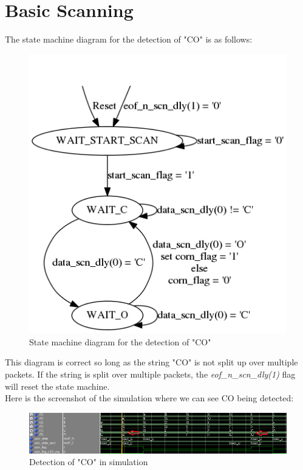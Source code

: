 \documentclass{article}
\begin{document}
\section{Basic Scanning}
The state machine diagram for the detection of "CO" is as follows:

	\begin{figure}[H]
		\begin{center}
			\includegraphics[scale=0.35]{../graphviz/part_2_state_diagram.png}
			\caption{State machine diagram for the detection of "CO"}
		\end{center}
	\end{figure}
	
This diagram is correct so long as the string "CO" is not split up over multiple packets. If the string is split over multiple packets, the \textit{eof\_n\_scn\_dly(1)} flag will reset the state machine. \\

Here is the screenshot of the simulation where we can see CO being detected:
	\begin{figure}[H]
		\begin{center}
			\includegraphics[scale=0.65]{../part2_files/CO_string_detection.PNG}
			\caption{Detection of "CO" in simulation}
		\end{center}
	\end{figure}
\end{document}
